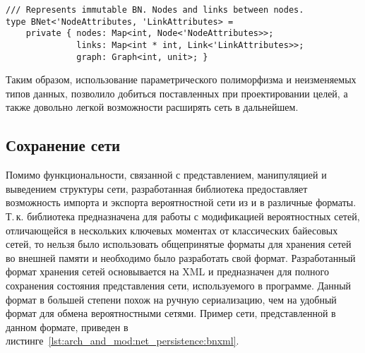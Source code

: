 \begin{lstlisting}[style=fsharpstyle,caption={Определение структуры данных для вероятностной сети}, label=lst:arch_and_mod:probab_net:bnet_definition]
/// Represents immutable BN. Nodes and links between nodes.
type BNet<'NodeAttributes, 'LinkAttributes> = 
    private { nodes: Map<int, Node<'NodeAttributes>>;
              links: Map<int * int, Link<'LinkAttributes>>;
              graph: Graph<int, unit>; } 
\end{lstlisting}

Таким образом, использование параметрического полиморфизма и не\-изменяемых типов данных, позволило добиться поставленных при проектировании целей, а также довольно легкой возможности расширять сеть в дальнейшем.

\subsection{Сохранение сети} %
\label{sub:arch_and_mod:net_persistence}

Помимо функциональности, связанной с представлением, манипуляцией и выведением структуры сети, разработанная библиотека предоставляет возможность импорта и экспорта вероятностной сети из и в различные форматы.
Т.\,к. библиотека предназначена для работы с модификацией вероятностных сетей, отличающейся в нескольких ключевых моментах от классических байесовых сетей, то нельзя было использовать общепринятые форматы для хранения сетей во внешней памяти и необходимо было разработать свой формат.
Разработанный формат хранения сетей основывается на XML и предназначен для полного сохранения состояния представления сети, используемого в программе.
Данный формат в большей степени похож на ручную сериализацию, чем на удобный формат для обмена вероятностными сетями.
Пример сети, представленной в данном формате, приведен в листинге~\ref{lst:arch_and_mod:net_persistence:bnxml}.

